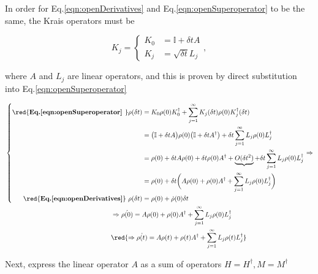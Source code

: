 \noindent    In    order   for    Eq.\eqref{eqn:openDerivatives}    and
Eq.\eqref{eqn:openSuperoperator} to  be the  same, the  Krais operators
must be

\begin{equation}
  K_j =
  \begin{cases}
    K_0 & = \mathbb{I} + \delta t A\\
    K_j & = \sqrt{\delta t}L_j
  \end{cases},
\end{equation}

\noindent where $A$ and $L_j$ are  linear operators, and this is proven
by direct substitution into Eq.\eqref{eqn:openSuperoperator}

\begin{equation}
  \begin{aligned}
    &\left\lbrace
      \begin{aligned}
        \text{\red{\textbf{Eq.\eqref{eqn:openSuperoperator}\ }}} \rho(\delta t) & = K_0\rho(0)K_0^\dagger + \sum_{j=1}^\infty K_j(\delta t)\rho(0)K_j^\dagger(\delta t)\\
        & = \big(\mathbb{I} + \delta t A\big)\rho(0)\big(\mathbb{I} + \delta t A^\dagger\big) + \delta t\sum_{j=1}^\infty L_j\rho(0)L_j^\dagger\\
        & = \rho(0) + \delta tA\rho(0) + \delta t\rho(0)A^\dagger + \underbrace{O(\delta t^2)} + \delta t\sum_{j=1}^\infty L_j\rho(0)L_j^\dagger\\
        & = \rho(0) + \delta t\bigg(A\rho(0) + \rho(0)A^\dagger + \sum_{j=1}^\infty L_j\rho(0)L_j^\dagger\bigg)\\
        \text{\red{\textbf{Eq.\eqref{eqn:openDerivatives}}}\
        }\rho(\delta t) & = \rho(0) + {\dot{\rho}(0)}\delta t
      \end{aligned}
    \right. \Rightarrow\\
    & \qquad \qquad \qquad \qquad \qquad \qquad \qquad \qquad \Rightarrow {\dot{\rho(0)} = A\rho(0) + \rho(0)A^\dagger + \sum_{j=1}^\infty L_j\rho(0)L_j^\dagger}\\
    &  \qquad   \qquad  \qquad  \qquad  \qquad   \qquad  \qquad  \qquad
    \red{\Rightarrow  \dot{\rho(t)}  =  A\rho(t) +  \rho(t)A^\dagger  +
      \sum_{j=1}^\infty L_j\rho(t)L_j^\dagger}
  \end{aligned}
  \label{eqn:openMarkovianDerivation}
\end{equation}

\noindent  Next,  express   the  linear  operator  $A$  as   a  sum  of
\textbf{\red{Hermitian}} operators $H=H^\dagger, M = M^\dagger$

